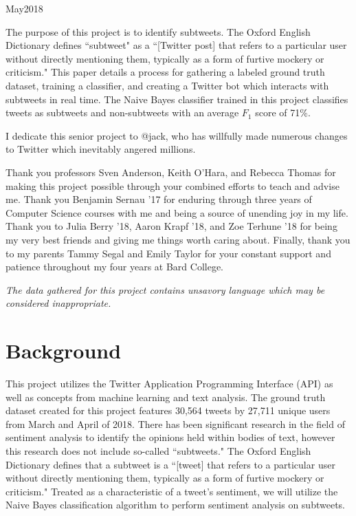 \documentclass[11pt, twoside, reqno]{book}
\begin{document}
    {May}{2018}

\abstr

The purpose of this project is to identify subtweets. The Oxford English Dictionary defines ``subtweet" as a ``[Twitter post] that refers to a particular user without directly mentioning them, typically as a form of furtive mockery or criticism." This paper details a process for gathering a labeled ground truth dataset, training a classifier, and creating a Twitter bot which interacts with subtweets in real time. The Naive Bayes classifier trained in this project classifies tweets as subtweets and non-subtweets with an average $F_{1}$ score of 71\%. 

\tableofcontents

\dedic

I dedicate this senior project to @jack, who has willfully made numerous changes to Twitter which inevitably angered millions.

\acknowl

Thank you professors Sven Anderson, Keith O'Hara, and Rebecca Thomas for making this project possible through your combined efforts to teach and advise me. Thank you Benjamin Sernau '17 for enduring through three years of Computer Science courses with me and being a source of unending joy in my life. Thank you to Julia Berry '18, Aaron Krapf '18, and Zoe Terhune '18 for being my very best friends and giving me things worth caring about. Finally, thank you to my parents Tammy Segal and Emily Taylor for your constant support and patience throughout my four years at Bard College. 

\startmain


\intro

\textit{The data gathered for this project contains unsavory language which may be considered inappropriate.}

\section{Background}
\label{background}

This project utilizes the Twitter Application Programming Interface (API) as well as concepts from machine learning and text analysis. The ground truth dataset created for this project features 30,564 tweets by 27,711 unique users from March and April of 2018. There has been significant research in the field of sentiment analysis to identify the opinions held within bodies of text, however this research does not include so-called ``subtweets." The Oxford English Dictionary defines that a subtweet is a ``[tweet] that refers to a particular user without directly mentioning them, typically as a form of furtive mockery or criticism." Treated as a characteristic of a tweet's sentiment, we will utilize the Naive Bayes classification algorithm to perform sentiment analysis on subtweets.
\end{document}

